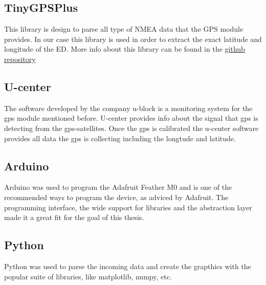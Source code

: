 \subsection{TinyGPSPlus}
\label{sec:s-m-tinygps}
This library is design to parse all type of NMEA data that the GPS module provides. In our case this 
library is used in order to extract the exact latitude and longitude of the ED. More info about this 
library can be found in the \href{https://github.com/mikalhart/TinyGPSPlus}{github repository}

\subsection{U-center}
\label{sec:s-m-ucenter}
The software developed by the company u-block is a monitoring system for the gps module mentioned before. 
U-center provides info about the signal that gps is detecting from the gps-satellites. Once the gps is 
calibrated the u-center software provides all data the gps is collecting including the longtude and latitude.

\subsection{Arduino}
\label{sec:s-m-lmic-code}
Arduino was used to program the Adafruit Feather M0 and is one of the recommended ways to program the device, 
as adviced by Adafruit. The programming interface, the wide support for libraries and the abstraction layer
made it a great fit for the goal of this thesis.

\subsection{Python}
Python was used to parse the incoming data and create the grapthics with the popular suite of libraries, like
matplotlib, numpy, etc. 
